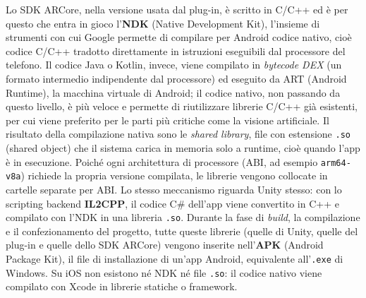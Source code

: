 Lo SDK ARCore, nella versione usata dal plug-in, è scritto in C/C++ ed è per questo che entra in gioco l'\textbf{NDK}\cite{NDK} (Native Development Kit), l'insieme di strumenti con cui Google permette di compilare per Android codice nativo, cioè codice C/C++ tradotto direttamente in istruzioni eseguibili dal processore del telefono. Il codice Java o Kotlin, invece, viene compilato in \textit{bytecode DEX} (un formato intermedio indipendente dal processore) ed eseguito da ART (Android Runtime), la macchina virtuale di Android; il codice nativo, non passando da questo livello, è più veloce e permette di riutilizzare librerie C/C++ già esistenti, per cui viene preferito per le parti più critiche come la visione artificiale. Il risultato della compilazione nativa sono le \textit{shared library}, file con estensione \texttt{.so} (shared object) che il sistema carica in memoria solo a runtime, cioè quando l'app è in esecuzione. Poiché ogni architettura di processore (ABI, ad esempio \texttt{arm64-v8a}) richiede la propria versione compilata, le librerie vengono collocate in cartelle separate per ABI. Lo stesso meccanismo riguarda Unity stesso: con lo scripting backend \textbf{IL2CPP}, il codice C\# dell'app viene convertito in C++ e compilato con l'NDK in una libreria \texttt{.so}. Durante la fase di \textit{build}, la compilazione e il confezionamento del progetto, tutte queste librerie (quelle di Unity, quelle del plug-in e quelle dello SDK ARCore) vengono inserite nell'\textbf{APK} (Android Package Kit), il file di installazione di un'app Android, equivalente all'\texttt{.exe} di Windows. Su iOS non esistono né NDK né file \texttt{.so}: il codice nativo viene compilato con Xcode in librerie statiche o framework.

